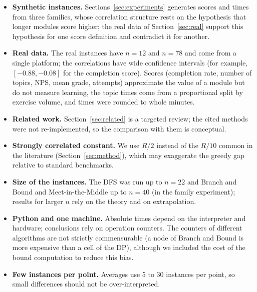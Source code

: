 \begin{itemize}[leftmargin=1.4em,itemsep=2pt]
\item \textbf{Synthetic instances.} Sections~\ref{sec:experiments} generates scores and times from three families, whose correlation structure rests on the hypothesis that longer modules score higher; the real data of Section~\ref{sec:real} support this hypothesis for one score definition and contradict it for another.
\item \textbf{Real data.} The real instances have $n=12$ and $n=78$ and come from a single platform; the correlations have wide confidence intervals (for example, $[-0.88,-0.08]$ for the completion score). Scores (completion rate, number of topics, NPS, mean grade, attempts) approximate the value of a module but do not measure learning, the topic times come from a proportional split by exercise volume, and times were rounded to whole minutes.
\item \textbf{Related work.} Section~\ref{sec:related} is a targeted review; the cited methods were not re-implemented, so the comparison with them is conceptual.
\item \textbf{Strongly correlated constant.} We use $R/2$ instead of the $R/10$ common in the literature (Section~\ref{sec:method}), which may exaggerate the greedy gap relative to standard benchmarks.
\item \textbf{Size of the instances.} The DFS was run up to $n=22$ and Branch and Bound and Meet-in-the-Middle up to $n=40$ (in the family experiment); results for larger $n$ rely on the theory and on extrapolation.
\item \textbf{Python and one machine.} Absolute times depend on the interpreter and hardware; conclusions rely on operation counters. The counters of different algorithms are not strictly commensurable (a node of Branch and Bound is more expensive than a cell of the DP), although we included the cost of the bound computation to reduce this bias.
\item \textbf{Few instances per point.} Averages use 5 to 30 instances per point, so small differences should not be over-interpreted.
\end{itemize}
